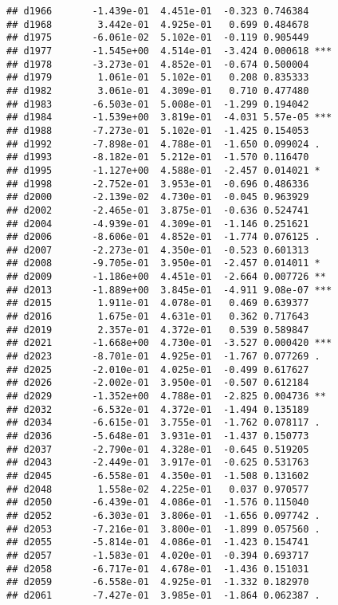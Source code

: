 \documentclass[
]{article}
\begin{document}
\begin{verbatim}
## d1966       -1.439e-01  4.451e-01  -0.323 0.746384    
## d1968        3.442e-01  4.925e-01   0.699 0.484678    
## d1975       -6.061e-02  5.102e-01  -0.119 0.905449    
## d1977       -1.545e+00  4.514e-01  -3.424 0.000618 ***
## d1978       -3.273e-01  4.852e-01  -0.674 0.500004    
## d1979        1.061e-01  5.102e-01   0.208 0.835333    
## d1982        3.061e-01  4.309e-01   0.710 0.477480    
## d1983       -6.503e-01  5.008e-01  -1.299 0.194042    
## d1984       -1.539e+00  3.819e-01  -4.031 5.57e-05 ***
## d1988       -7.273e-01  5.102e-01  -1.425 0.154053    
## d1992       -7.898e-01  4.788e-01  -1.650 0.099024 .  
## d1993       -8.182e-01  5.212e-01  -1.570 0.116470    
## d1995       -1.127e+00  4.588e-01  -2.457 0.014021 *  
## d1998       -2.752e-01  3.953e-01  -0.696 0.486336    
## d2000       -2.139e-02  4.730e-01  -0.045 0.963929    
## d2002       -2.465e-01  3.875e-01  -0.636 0.524741    
## d2004       -4.939e-01  4.309e-01  -1.146 0.251621    
## d2006       -8.606e-01  4.852e-01  -1.774 0.076125 .  
## d2007       -2.273e-01  4.350e-01  -0.523 0.601313    
## d2008       -9.705e-01  3.950e-01  -2.457 0.014011 *  
## d2009       -1.186e+00  4.451e-01  -2.664 0.007726 ** 
## d2013       -1.889e+00  3.845e-01  -4.911 9.08e-07 ***
## d2015        1.911e-01  4.078e-01   0.469 0.639377    
## d2016        1.675e-01  4.631e-01   0.362 0.717643    
## d2019        2.357e-01  4.372e-01   0.539 0.589847    
## d2021       -1.668e+00  4.730e-01  -3.527 0.000420 ***
## d2023       -8.701e-01  4.925e-01  -1.767 0.077269 .  
## d2025       -2.010e-01  4.025e-01  -0.499 0.617627    
## d2026       -2.002e-01  3.950e-01  -0.507 0.612184    
## d2029       -1.352e+00  4.788e-01  -2.825 0.004736 ** 
## d2032       -6.532e-01  4.372e-01  -1.494 0.135189    
## d2034       -6.615e-01  3.755e-01  -1.762 0.078117 .  
## d2036       -5.648e-01  3.931e-01  -1.437 0.150773    
## d2037       -2.790e-01  4.328e-01  -0.645 0.519205    
## d2043       -2.449e-01  3.917e-01  -0.625 0.531763    
## d2045       -6.558e-01  4.350e-01  -1.508 0.131602    
## d2048        1.558e-02  4.225e-01   0.037 0.970577    
## d2050       -6.439e-01  4.086e-01  -1.576 0.115040    
## d2052       -6.303e-01  3.806e-01  -1.656 0.097742 .  
## d2053       -7.216e-01  3.800e-01  -1.899 0.057560 .  
## d2055       -5.814e-01  4.086e-01  -1.423 0.154741    
## d2057       -1.583e-01  4.020e-01  -0.394 0.693717    
## d2058       -6.717e-01  4.678e-01  -1.436 0.151031    
## d2059       -6.558e-01  4.925e-01  -1.332 0.182970    
## d2061       -7.427e-01  3.985e-01  -1.864 0.062387 .  

\end{verbatim}
\end{document}
